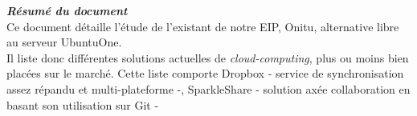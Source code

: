 \thispagestyle{empty}
\vspace*{10mm}

\textbf{\emph{\textcolor{epiBlue}{Résumé du document} } }\\

Ce document détaille l'étude de l'existant de notre EIP, Onitu, alternative libre au serveur UbuntuOne.\\
Il liste donc différentes solutions actuelles de \emph{cloud-computing}, plus ou moins bien placées sur le marché. Cette liste comporte Dropbox - service de synchronisation assez répandu et multi-plateforme -, SparkleShare - solution axée collaboration en basant son utilisation sur Git -

\newpage
